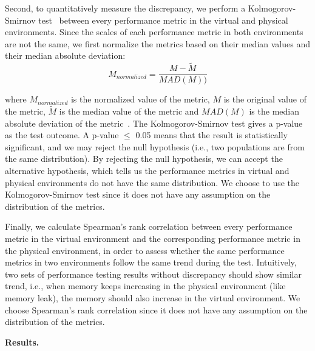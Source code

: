 Second, to quantitatively measure the discrepancy, we perform a Kolmogorov-Smirnov test~\cite{kstest} between every performance metric in the virtual and physical environments. Since the scales of each performance metric in both environments are not the same, we first normalize the metrics based on their median values and their median absolute deviation: 
\begin{equation}
	\label{equ:mad}
		M_{normalized}=\frac{M-\tilde{M}}{MAD(M))}		
\end{equation}
	
where $M_{normalized}$ is the normalized value of the metric, $M$ is the original value of the metric, $\tilde{M}$ is the median value of the metric and $MAD(M)$ is the median absolute deviation of the metric~\cite{walker1929studies}. The Kolmogorov-Smirnov test gives a p-value as the test outcome. A p-value $\leq$ 0.05 means that the result is statistically significant, and we may reject the null hypothesis (i.e., two populations are from the same distribution). By rejecting the null hypothesis, we can accept the alternative hypothesis, which tells us the performance metrics in virtual and physical environments do not have the same distribution. We choose to use the Kolmogorov-Smirnov test since it does not have any assumption on the distribution of the metrics.

Finally, we calculate Spearman's rank correlation between every performance metric in the virtual environment and the corresponding performance metric in the physical environment, in order to assess whether the same performance metrics in two environments follow the same trend during the test. Intuitively, two sets of performance testing results without discrepancy should show similar trend, i.e., when memory keeps increasing in the physical environment (like memory leak), the memory should also increase in the virtual environment. We choose Spearman's rank correlation since it does not have any assumption on the distribution of the metrics. 

\noindent \textbf{Results.}

